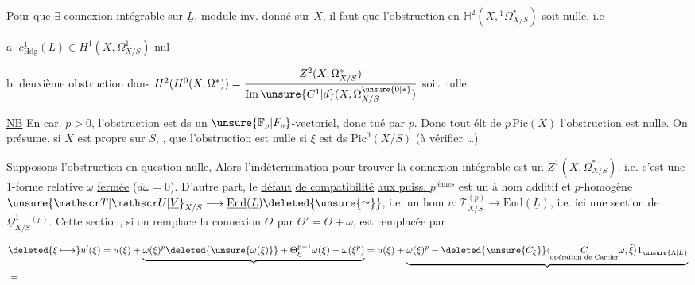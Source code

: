 Pour que $\exists$ connexion intégrable sur $\underline L$, module inv. donné sur $X$, il faut que l'obstruction en $\mathbb H^2(X,{}^1\Omega^*_{X/S})$ soit nulle, i.e

\textcircled{a}  $c^1_{\mathrm{Hdg}}(L)\in H^1(X,\Omega^1_{X/S})$ nul

\textcircled{b} deuxième obstruction dans $H^2(H^0(X,\Omega^*))=\dfrac{Z^2(X,\Omega^*_{X/S})}{\mathrm{Im}\,\unsure{C^1|d}(X,\Omega^{\unsure{0|*}}_{X/S})}$ soit nulle.

\uline{NB} En car. $p>0$, l'obstruction est ds un $\unsure{\mathbb F_p|F_p}$-vectoriel, donc tué par $p$. Donc  tout élt de $p\,\mathrm{Pic}(X)$ l'obstruction est nulle. On présume, si $X$ est propre sur $S$, , que l'obstruction est nulle  si $\xi$ est ds $\mathrm{Pic}^0(X/S)$ (à vérifier \ldots).

Supposons l'obstruction en question nulle,  Alors l'indétermination pour trouver la connexion intégrable est un $Z^1(X,\Omega^*_{X/S})$, i.e. c'est une 1-forme relative $\omega$ \uline{fermée} ($d\omega=0$).   D'autre part, le \uline{défaut} \uline{de compatibilité} \uline{aux puiss. $p^{\mathrm{ièmes}}$} est un  à hom additif et $p$-homogène ${\unsure{\mathscr T|\mathscr U|\underline V}}_{X/S}\longrightarrow\underline{\mathrm{End}}(\underline L)\deleted{\unsure{\simeq}}$, i.e. un hom $u:\mathscr T^{(p)}_{X/S}\longrightarrow\mathrm{End}(\underline L)$, i.e. ici une section de $\underline\Omega^1_{X/S}{}^{(p)}$. Cette section, si on remplace la connexion $\Theta^{{}}$ par $\Theta'=\Theta+\omega$, est remplacée par


\[
\begin{aligned}
&\deleted{\xi\longmapsto}u'(\xi)=u(\xi)+\underbrace{\omega(\xi)^p\deleted{\unsure{\omega(\xi)}}+\Theta_\xi^{p-1}\omega(\xi)-\omega(\xi^p)}
=u(\xi)+\underbrace{\omega(\xi)^p-\deleted{\unsure{C_\xi}}\langle\underset{\text{opération de Cartier}}{C}\omega,\widetilde\xi\rangle1_{\unsure{\underline\Lambda|\underline L}}}\\
&=
\end{aligned}
\]

